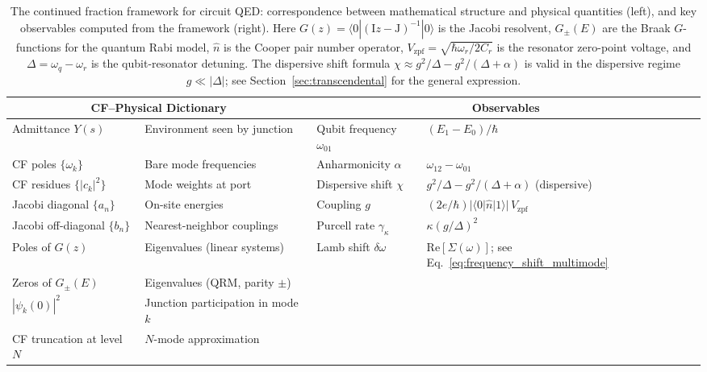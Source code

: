 \documentclass[reprint, floatfix, superscriptaddress, amsmath, amssymb, longbibliography]{revtex4-2}
\begin{document}
\begin{table}[t]
\caption{The continued fraction framework for circuit QED: correspondence between mathematical structure and physical quantities (left), and key observables computed from the framework (right). Here $G(z) = \langle 0|(\mathrm{I}z-\mathrm{J})^{-1}|0\rangle$ is the Jacobi resolvent, $G_\pm(E)$ are the Braak $G$-functions for the quantum Rabi model, $\hat{n}$ is the Cooper pair number operator, $V_\mathrm{zpf} = \sqrt{\hbar\omega_r/2C_r}$ is the resonator zero-point voltage, and $\Delta = \omega_q - \omega_r$ is the qubit-resonator detuning. The dispersive shift formula $\chi \approx g^2/\Delta - g^2/(\Delta+\alpha)$ is valid in the dispersive regime $g \ll |\Delta|$; see Section~\ref{sec:transcendental} for the general expression.}
\label{tab:cf_framework}
\begin{ruledtabular}
\begin{tabular}{ll|ll}
\multicolumn{2}{c|}{\textrm{CF--Physical Dictionary}} & 
\multicolumn{2}{c}{\textrm{Observables}} \\
\midrule
Admittance $Y(s)$ & Environment seen by junction & 
Qubit frequency $\omega_{01}$ & $(E_1 - E_0)/\hbar$ \\[2pt]
CF poles $\{\omega_k\}$ & Bare mode frequencies & 
Anharmonicity $\alpha$ & $\omega_{12} - \omega_{01}$ \\[2pt]
CF residues $\{|c_k|^2\}$ & Mode weights at port & 
Dispersive shift $\chi$ & $g^2/\Delta - g^2/(\Delta+\alpha)$ (dispersive) \\[2pt]
Jacobi diagonal $\{a_n\}$ & On-site energies & 
Coupling $g$ & $(2e/\hbar)|\langle 0|\hat{n}|1\rangle|\,V_\mathrm{zpf}$ \\[2pt]
Jacobi off-diagonal $\{b_n\}$ & Nearest-neighbor couplings & 
Purcell rate $\gamma_\kappa$ & $\kappa(g/\Delta)^2$ \\[2pt]
Poles of $G(z)$ & Eigenvalues (linear systems) & 
Lamb shift $\delta\omega$ & $\mathrm{Re}[\Sigma(\omega)]$; see Eq.~\eqref{eq:frequency_shift_multimode} \\[2pt]
Zeros of $G_\pm(E)$ & Eigenvalues (QRM, parity $\pm$) & & \\[2pt]
$|\psi_k(0)|^2$ & Junction participation in mode $k$ & & \\[2pt]
CF truncation at level $N$ & $N$-mode approximation & & \\
\end{tabular}
\end{ruledtabular}
\end{table}
\end{document}
